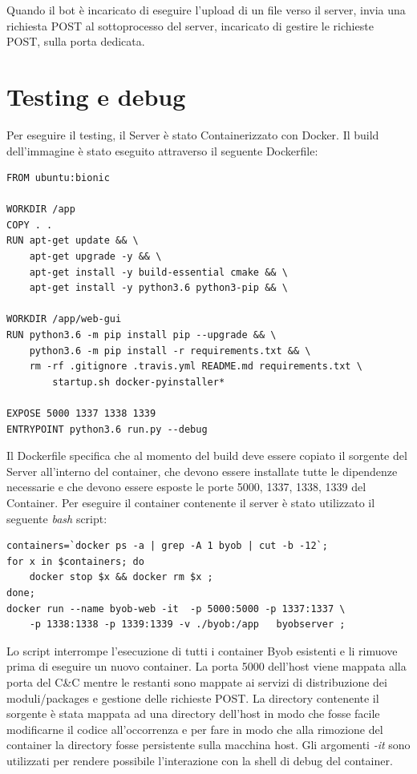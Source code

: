 Quando il bot è incaricato di eseguire l'upload di un file verso il server, invia una richiesta POST al sottoprocesso del server, incaricato di gestire le richieste POST, sulla porta dedicata.

\section{Testing e debug}
Per eseguire il testing, il Server è stato Containerizzato con Docker.
Il build dell'immagine è stato eseguito attraverso il seguente Dockerfile:
\lstset{  basicstyle=\footnotesize,
frame=single}
\begin{lstlisting}[caption={Byob Server Dockerfile},label={listing-byobdocker},frame=single]
FROM ubuntu:bionic

WORKDIR /app
COPY . .
RUN apt-get update && \
    apt-get upgrade -y && \
    apt-get install -y build-essential cmake && \
    apt-get install -y python3.6 python3-pip && \

WORKDIR /app/web-gui
RUN python3.6 -m pip install pip --upgrade && \
    python3.6 -m pip install -r requirements.txt && \
    rm -rf .gitignore .travis.yml README.md requirements.txt \
        startup.sh docker-pyinstaller*

EXPOSE 5000 1337 1338 1339
ENTRYPOINT python3.6 run.py --debug
\end{lstlisting}
Il Dockerfile specifica che al momento del build deve essere copiato il sorgente del Server all'interno del container, che devono essere installate tutte le dipendenze necessarie e che devono essere esposte le porte 5000, 1337, 1338, 1339 del Container.
Per eseguire  il container contenente il server è stato utilizzato  il seguente \textit{bash} script:
\begin{lstlisting}
containers=`docker ps -a | grep -A 1 byob | cut -b -12`;
for x in $containers; do 
    docker stop $x && docker rm $x ;
done;
docker run --name byob-web -it  -p 5000:5000 -p 1337:1337 \
    -p 1338:1338 -p 1339:1339 -v ./byob:/app   byobserver ;
\end{lstlisting}
Lo script interrompe l'esecuzione di tutti i container Byob esistenti e li rimuove prima di eseguire un nuovo container. La porta 5000 dell'host viene mappata alla porta del C\&C  mentre le restanti sono mappate ai servizi di distribuzione dei moduli/packages e    gestione delle richieste POST. La directory contenente il sorgente è stata mappata ad una directory dell'host in modo che fosse facile modificarne il codice all'occorrenza e per fare in modo che alla rimozione del container la directory fosse persistente sulla macchina host. Gli argomenti \textit{-it} sono utilizzati per rendere possibile l'interazione con la shell di debug del container.

